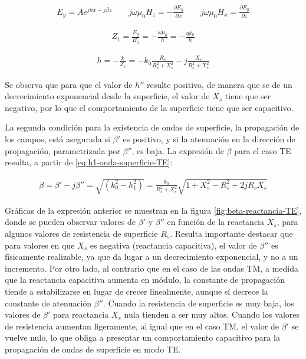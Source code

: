 \begin{equation}
	\label{eq:campo-electrico-superficie-TE}
	\begin{aligned}
		E_y = A e^{jhx-j\beta z} \qquad j\omega \mu_0 H_z = -\frac{\partial E_y}{\partial x} \qquad j\omega \mu_0 H_x = \frac{\partial E_y}{\partial z}
	\end{aligned}
\end{equation}

\begin{align}
	\label{eq:impedancia-onda-superficie-TE}
	Z_1 = \frac{E_y}{H_z} = -\frac{\omega \mu_0}{h} = -\frac{\eta k_0}{h}
\end{align}

\begin{align}
	\label{eq:h1-onda-superficie-TE}
	h = -\frac{k}{Z_s} = -k_0 \frac{R_s}{{R_s^2 + X_s^2}}-j\frac{X_s}{R_s^2 + X_s^2}
\end{align}

Se observa que para que el valor de $h''$ resulte positivo, de manera que se de un decrecimiento exponencial desde la superficie, el valor de $X_s$ tiene que ser negativo, por lo que el comportamiento de la superficie tiene que ser capacitivo.

La segunda condición para la existencia de ondas de superficie, la propagación de los campos, está asegurada si $\beta'$ es positivo, y si la atenuación en la dirección de propagación, parametrizada por $\beta''$, es baja. La expresión de $\beta$ para el caso TE resulta, a partir de \ref{eq:h1-onda-superficie-TE}:

\begin{align}
	\beta = \beta'-j\beta''= \sqrt{(k_0^2 - h_1^2)} = \frac{k_0}{R_s^2+X_s^2} \sqrt{1+X_s^2 - R_s^2 + 2jR_s X_s} \label{eq:beta-onda-superficie-TE}
\end{align}

Gráficas de la expresión anterior se muestran en la figura \ref{fig:beta-reactancia-TE}, donde se pueden observar valores de $\beta'$ y $\beta''$ en función de la reactancia $X_s$, para algunos valores de resistencia de superficie $R_s$. Resulta importante destacar que para valores en que $X_s$ es negativa (reactancia capacitiva), el valor de $\beta''$ es físicamente realizable, ya que da lugar a un decrecimiento exponencial, y no a un incremento. Por otro lado, al contrario que en el caso de las ondas TM, a medida que la reactancia capacitiva aumenta en módulo, la constante de propagación tiende a estabilizarse en lugar de crecer linealmente, aunque sí decrece la constante de atenuación $\beta''$. Cuando la resistencia de superficie es muy baja, los valores de $\beta'$ para reactancia $X_s$ nula tienden a ser muy altos. Cuando los valores de resistencia aumentan ligeramente, al igual que en el caso TM, el valor de $\beta'$ se vuelve nulo, lo que obliga a presentar un comportamiento capacitivo para la propagación de ondas de superficie en modo TE.


